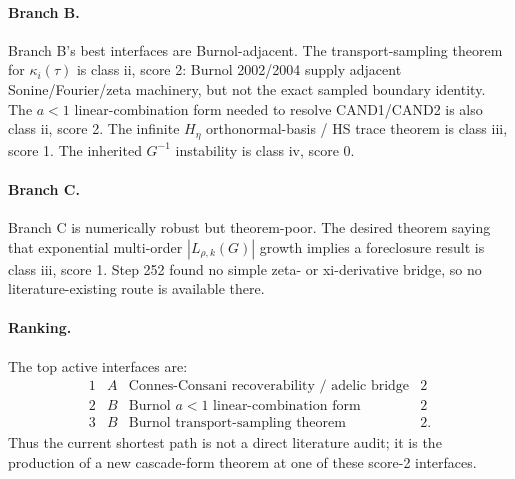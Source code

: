 \paragraph{Branch B.}
Branch B's best interfaces are Burnol-adjacent.  The transport-sampling theorem
for \(\kappa_i(\tau)\) is class ii, score 2: Burnol 2002/2004 supply adjacent
Sonine/Fourier/zeta machinery, but not the exact sampled boundary identity.
The \(a<1\) linear-combination form needed to resolve CAND1/CAND2 is also class
ii, score 2.  The infinite \(H_\eta\) orthonormal-basis / HS trace theorem is
class iii, score 1.  The inherited \(G^{-1}\) instability is class iv, score 0.

\paragraph{Branch C.}
Branch C is numerically robust but theorem-poor.  The desired theorem saying
that exponential multi-order \(|L_{\rho,k}(G)|\) growth implies a foreclosure
result is class iii, score 1.  Step 252 found no simple zeta- or xi-derivative
bridge, so no literature-existing route is available there.

\paragraph{Ranking.}
The top active interfaces are:
\[
\begin{array}{rllc}
1 & A & \text{Connes-Consani recoverability / adelic bridge} & 2\\
2 & B & \text{Burnol \(a<1\) linear-combination form} & 2\\
3 & B & \text{Burnol transport-sampling theorem} & 2.
\end{array}
\]
Thus the current shortest path is not a direct literature audit; it is the
production of a new cascade-form theorem at one of these score-2 interfaces.

